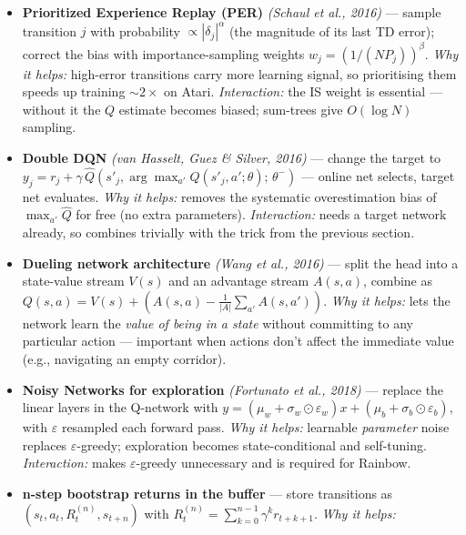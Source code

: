 \documentclass[11pt]{article}
\begin{document}
\begin{itemize}
\item
  \label{trick-3-3-1}\textbf{Prioritized Experience
  Replay (PER)} \emph{(Schaul et al., 2016)} --- sample transition \(j\)
  with probability \(\propto |\delta_j|^\alpha\) (the magnitude of its
  last TD error); correct the bias with importance-sampling weights
  \(w_j = (1/(N P_j))^\beta\). \emph{Why it helps:} high-error
  transitions carry more learning signal, so prioritising them speeds up
  training \(\sim 2\times\) on Atari. \emph{Interaction:} the IS weight
  is essential --- without it the \(Q\) estimate becomes biased;
  sum-trees give \(O(\log N)\) sampling.
\item
  \label{trick-3-3-2}\textbf{Double DQN} \emph{(van
  Hasselt, Guez \& Silver, 2016)} --- change the target to
  \(y_j = r_j + \gamma\,\hat{Q}(s'_j, \arg\max_{a'} Q(s'_j,a';\theta);\,\theta^-)\)
  --- online net selects, target net evaluates. \emph{Why it helps:}
  removes the systematic overestimation bias of \(\max_{a'} \hat{Q}\)
  for free (no extra parameters). \emph{Interaction:} needs a target
  network already, so combines trivially with the trick from the
  previous section.
\item
  \label{trick-3-3-3}\textbf{Dueling network
  architecture} \emph{(Wang et al., 2016)} --- split the head into a
  state-value stream \(V(s)\) and an advantage stream \(A(s,a)\),
  combine as
  \(Q(s,a) = V(s) + (A(s,a) - \tfrac{1}{|A|}\sum_{a'} A(s,a'))\).
  \emph{Why it helps:} lets the network learn the \emph{value of being
  in a state} without committing to any particular action --- important
  when actions don't affect the immediate value (e.g., navigating an
  empty corridor).
\item
  \label{trick-3-3-4}\textbf{Noisy Networks for
  exploration} \emph{(Fortunato et al., 2018)} --- replace the linear
  layers in the Q-network with
  \(y = (\mu_w + \sigma_w \odot \varepsilon_w)x + (\mu_b + \sigma_b \odot \varepsilon_b)\),
  with \(\varepsilon\) resampled each forward pass. \emph{Why it helps:}
  learnable \emph{parameter} noise replaces \(\varepsilon\)-greedy;
  exploration becomes state-conditional and self-tuning.
  \emph{Interaction:} makes \(\varepsilon\)-greedy unnecessary and is
  required for Rainbow.
\item
  \label{trick-3-3-5}\textbf{n-step bootstrap returns in
  the buffer} --- store transitions as
  \((s_t, a_t, R^{(n)}_t, s_{t+n})\) with
  \(R^{(n)}_t=\sum_{k=0}^{n-1}\gamma^k r_{t+k+1}\). \emph{Why it helps:}

\end{itemize}
\end{document}
